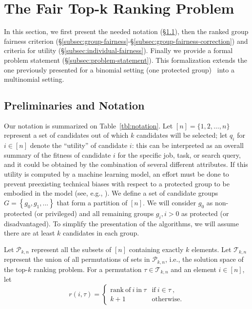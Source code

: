 
\section{The Fair Top-k Ranking Problem}\label{sec:problem}

In this section, we first present the needed notation (\S\ref{subsec:preliminaries}), then the ranked group fairness criterion (\S\ref{subsec:group-fairness}-\S\ref{subsec:group-fairness-correction}) and criteria for utility (\S\ref{subsec:individual-fairness}). Finally we provide a formal problem statement (\S\ref{subsec:problem-statement}).
%
This formalization extends the one previously presented for a binomial setting (one protected group)~\cite{zehlike2017fair} into a multinomial setting.

\subsection{Preliminaries and Notation}
\label{subsec:preliminaries}
Our notation is summarized on Table~\ref{tbl:notation}.
%
Let $[n] = \{ 1, 2, \dots, n \}$ represent a set of candidates out of which $k$ candidates will be selected; let $q_i$ for $i \in [n]$ denote the ``utility'' of candidate $i$: this can be interpreted as an overall summary of the fitness of candidate $i$ for the specific job, task, or search query, and it could be obtained by the combination of several different attributes.
%
If this utility is computed by a machine learning model, an effort must be done to prevent preexisting technical biases with respect to a protected group to be embodied in the model (see, e.g., \citemissing).
%
We define a set of candidate groups $G = \left\{ g_0, g_1, ... \right\}$ that form a partition of $[n]$. We will consider $g_0$ as non-protected (or privileged) and all remaining groups $g_i, i>0$ as protected (or disadvantaged).
%
To simplify the presentation of the algorithms, we will assume there are at least $k$ candidates in each group. %

Let ${\mathcal P}_{k,n}$ represent all the subsets of $[n]$ containing exactly $k$ elements.
%
Let ${\mathcal T}_{k,n}$ represent the union of all permutations of sets in ${\mathcal P}_{k,n}$, i.e., the solution space of the top-$k$ ranking problem.
%
For a permutation $\tau \in {\mathcal T}_{k,n}$ and an element $i \in [n]$, let
\[
r(i, \tau) = \begin{cases}
\mathrm{rank~of~} i \mathrm{~in~} \tau & \mathrm{if~} i \in \tau~, \\
k + 1 & \mathrm{otherwise}.
\end{cases}
\]

